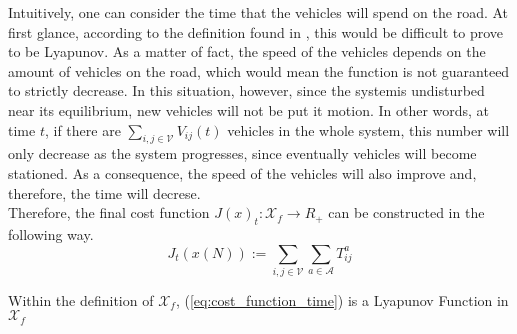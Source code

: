 Intuitively, one can consider the time that the vehicles will spend on the road. At first glance, according to the definition found in , this would be difficult to prove to be Lyapunov. As a matter of fact, the speed of the vehicles depends on the amount of vehicles on the road, which would mean the function is not guaranteed to strictly decrease. In this situation, however, since the systemis undisturbed near its equilibrium, new vehicles will not be put it motion. In other words, at time $t$, if there are $\sum_{i,j \in \mathcal{V}}V_{ij}(t)$ vehicles in the whole system, this number will only decrease as the system progresses, since eventually vehicles will become stationed. As a consequence, the speed of the vehicles will also improve and, therefore, the time will decrese. \\
Therefore, the final cost function $J(x)_t : \mathcal{X}_f \rightarrow R_+$ can be constructed in the following way. 
\begin{equation}
	J_t(x(N)):= \sum_{i,j \in \mathcal{V}}\sum_{a \in\mathcal{A}}T_{ij}^a
	\label{eq:cost_function_time}
\end{equation}

\begin{proposition}{}
	Within the definition of $\mathcal{X}_f$, (\ref{eq:cost_function_time}) is a Lyapunov Function in $\mathcal{X}_f$
\end{proposition}\\

